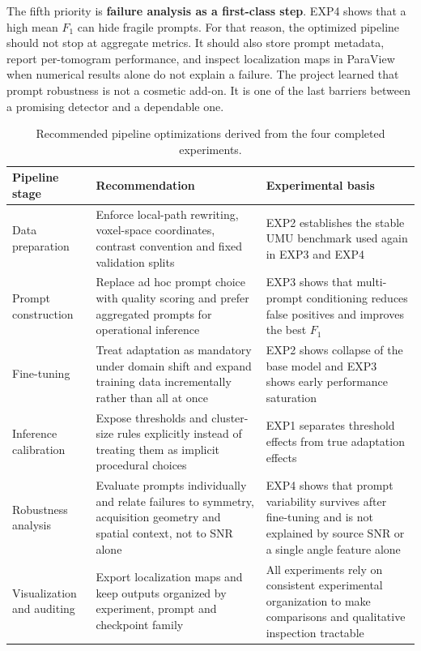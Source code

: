 \documentclass[12pt,a4paper]{report}
\begin{document}
The fifth priority is \textbf{failure analysis as a first-class step}. EXP4 shows that a high mean \(F_1\) can hide fragile prompts. For that reason, the optimized pipeline should not stop at aggregate metrics. It should also store prompt metadata, report per-tomogram performance, and inspect localization maps in ParaView when numerical results alone do not explain a failure. The project learned that prompt robustness is not a cosmetic add-on. It is one of the last barriers between a promising detector and a dependable one.

\begin{table}[H]
  \centering
  \small
  \begin{tabularx}{\textwidth}{>{\raggedright\arraybackslash}p{} >{\raggedright\arraybackslash}p{} Y}
    \toprule
    Pipeline stage & Recommendation & Experimental basis \\
    \midrule
    Data preparation & Enforce local-path rewriting, voxel-space coordinates, contrast convention and fixed validation splits & EXP2 establishes the stable UMU benchmark used again in EXP3 and EXP4 \\
    Prompt construction & Replace ad hoc prompt choice with quality scoring and prefer aggregated prompts for operational inference & EXP3 shows that multi-prompt conditioning reduces false positives and improves the best \(F_1\) \\
    Fine-tuning & Treat adaptation as mandatory under domain shift and expand training data incrementally rather than all at once & EXP2 shows collapse of the base model and EXP3 shows early performance saturation \\
    Inference calibration & Expose thresholds and cluster-size rules explicitly instead of treating them as implicit procedural choices & EXP1 separates threshold effects from true adaptation effects \\
    Robustness analysis & Evaluate prompts individually and relate failures to symmetry, acquisition geometry and spatial context, not to SNR alone & EXP4 shows that prompt variability survives after fine-tuning and is not explained by source SNR or a single angle feature alone \\
    Visualization and auditing & Export localization maps and keep outputs organized by experiment, prompt and checkpoint family & All experiments rely on consistent experimental organization to make comparisons and qualitative inspection tractable \\
    \bottomrule
  \end{tabularx}
  \caption{Recommended pipeline optimizations derived from the four completed experiments.}
  \label{tab:pipeline-recommendations}
\end{table}
\end{document}
